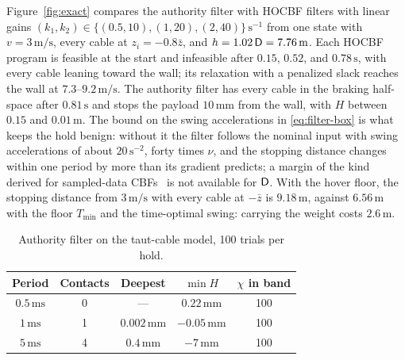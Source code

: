 Figure~\ref{fig:exact} compares the authority filter with HOCBF filters with linear gains $(k_1,k_2)\in\{(0.5,10),(1,20),(2,40)\}\,\mathrm{s^{-1}}$ from one state with $v=3\,\mathrm{m/s}$, every cable at $z_i=-0.8\bar z$, and $h=1.02\,\mathsf{D}=7.76\,\mathrm m$. Each HOCBF program is feasible at the start and infeasible after $0.15$, $0.52$, and $0.78\,\mathrm s$, with every cable leaning toward the wall; its relaxation with a penalized slack reaches the wall at $7.3$--$9.2\,\mathrm{m/s}$. The authority filter has every cable in the braking half-space after $0.81\,\mathrm s$ and stops the payload $10\,\mathrm{mm}$ from the wall, with $H$ between $0.15$ and $0.01\,\mathrm m$. The bound on the swing accelerations in \eqref{eq:filter-box} is what keeps the hold benign: without it the filter follows the nominal input with swing accelerations of about $20\,\mathrm{s^{-2}}$, forty times $\nu$, and the stopping distance changes within one period by more than its gradient predicts; a margin of the kind derived for sampled-data CBFs~\cite{breeden2022sampled} is not available for $\mathsf{D}$. With the hover floor, the stopping distance from $3\,\mathrm{m/s}$ with every cable at $-\bar z$ is $9.18\,\mathrm m$, against $6.56\,\mathrm m$ with the floor $T_{\min}$ and the time-optimal swing: carrying the weight costs $2.6\,\mathrm m$.

\begin{table}[t]
\caption{Authority filter on the taut-cable model, 100 trials per hold.}\label{tab:exact}
\centering\footnotesize\setlength{\tabcolsep}{4pt}
\begin{tabular}{@{}ccccc@{}}
\toprule
Period & Contacts & Deepest & $\min H$ & $\chi$ in band\\
\midrule
$0.5\,\mathrm{ms}$ & 0 & --- & $0.22\,\mathrm{mm}$ & 100\\
$1\,\mathrm{ms}$ & 1 & $0.002\,\mathrm{mm}$ & $-0.05\,\mathrm{mm}$ & 100\\
$5\,\mathrm{ms}$ & 4 & $0.4\,\mathrm{mm}$ & $-7\,\mathrm{mm}$ & 100\\
\bottomrule
\end{tabular}
\end{table}

